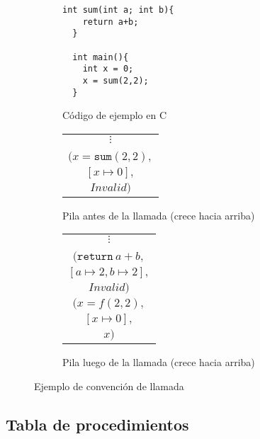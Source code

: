 \begin{figure}
\centering
  \begin{subfigure}{0.3\textwidth}
  \begin{lstlisting}[mathescape=true]
  int sum(int a; int b){
    return a+b;
  }

  int main(){
    int x = 0;
    x = sum(2,2);
  }
  \end{lstlisting}
  \caption{Código de ejemplo en C}
  \label{fig:stack_ex_c_code}
  \end{subfigure}
  \begin{subfigure}{0.3\textwidth}
  \centering
    \begin{tabular}{|c|}
      \hline
      \hline
      $\vdots$ \\
      \\
      \hline
      $(x = \mathtt{sum}(2,2),$ \\
      $[x \mapsto 0],$ \\
      $ Invalid )$ \\
      \hline \hline
    \end{tabular}
  \caption{Pila antes de la llamada (crece hacia arriba)}
  \label{fig:stack_bef_fun_call}
  \end{subfigure}
  \begin{subfigure}{0.3\textwidth}
    \begin{tabular}{|c|}
      \hline
      \hline
      $\vdots$ \\
      \\
      \hline
      $(\mathtt{return}\ a+b,$ \\
      $[a \mapsto 2, b \mapsto 2],$ \\
      $ Invalid )$ \\
      \hline
      $(x = f(2,2),$ \\
      $[x \mapsto 0],$ \\
      $ x )$ \\
      \hline \hline
    \end{tabular}
  \caption{Pila luego de la llamada (crece hacia arriba)}
  \label{fig:stack_aft_fun_call}
  \end{subfigure}

  \caption{Ejemplo de convención de llamada}
  \label{fig:stack_example}
\end{figure}

\subsection{Tabla de procedimientos}\label{subsection:procedure_table}

